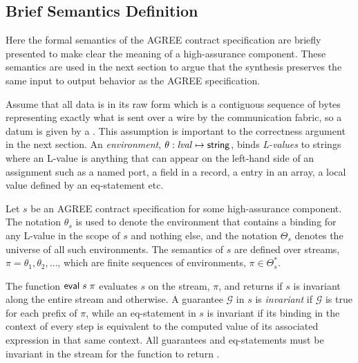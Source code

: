 \subsection{Brief Semantics Definition}
\label{agree-semantics}
Here the formal semantics of the AGREE contract specification are briefly
presented to make clear the meaning of a high-assurance component.
These semantics are used in the next section to argue that the synthesis
preserves the same input to output behavior as the AGREE specification.

Assume that all data is in its raw form which is a contiguous sequence of bytes
representing exactly what is sent over a wire by the communication fabric, so a
datum is given by a . This assumption is important to the
correctness argument in the next section. An \emph{environment},
$\theta: \mathit{lval} \mapsto \mathsf{string}$, binds \emph{L-values} to strings where
an L-value is anything that can appear on the left-hand side of an assignment
such as a named port, a field in a record, a entry in an array, a local
value defined by an eq-statement etc.

Let $s$ be an AGREE contract specification for some high-assurance
component. The notation $\theta_s$ is used to denote the environment that
contains a binding for any L-value in the scope of $s$ and nothing else, and
the notation $\Theta_s$ denotes the universe of all such environments. The
semantics of $s$ are defined over streams, $\pi = \theta_1, \theta_2, \ldots$, which
are finite sequences of environments, $\pi \in \Theta_s^*$.



The function $\mathsf{eval}\; s\; \pi$ evaluates $s$ on the stream,
$\pi$, and returns  if $s$ is invariant along the entire
stream and  otherwise. A guarantee $\mathcal{G}$ in $s$
is \emph{invariant} if $\mathcal{G}$ is true for each prefix of $\pi$,
while an eq-statement in $s$ is invariant if its binding in the
context of every step is equivalent to the computed value of its
associated expression in that same context. All guarantees and
eq-statements must be invariant in the stream for the function to
return .

